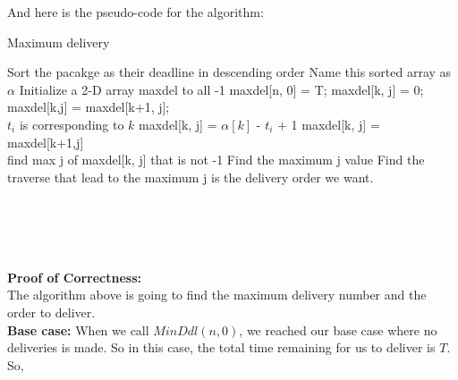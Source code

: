 \documentclass[14pt]{article}
\begin{document}
\begin{enumerate}
    And here is the pseudo-code for the algorithm:\\
       \begin{minipage}{\linewidth}
            \begin{algorithm}[H]
              \caption{Maximum delivery}
              \begin{algorithmic}[1]
                \State Sort the pacakge as their deadline in descending order 
                \State Name this sorted array as$\alpha$
                \State Initialize a 2-D array maxdel to all -1
                maxdel[n, 0] = T;
                            \State maxdel[k, j] = 0;
                        \EndIf
                           \State maxdel[k,j] = maxdel[k+1, j];
                            \\\Comment $t_i$ is corresponding to $k$
                            \State  maxdel[k, j] = $\alpha[k]$ - $t_i$ + 1
                        \Else
                            \State maxdel[k, j] = maxdel[k+1,j]
                        \EndIf
                   \EndFor
                \EndFor\\
                        \State find max j of maxdel[k, j] that is not -1
                        \Comment Find the maximum j value
                    \EndFor
                \EndFor
                \State Find the traverse that lead to the maximum j is the
                delivery order we want.
              \end{algorithmic}
            \end{algorithm}
        \end{minipage}\\\\\\\\
    \textbf{Proof of Correctness:}\\
    The algorithm above is going to find the maximum delivery number and the order
    to deliver.\\
    \textbf{Base case:} When we call $MinDdl(n,0)$, we reached our base case where no 
    deliveries is made. So in this case, the total time remaining for us to deliver is $T$. So, 

\end{enumerate}
\end{document}
